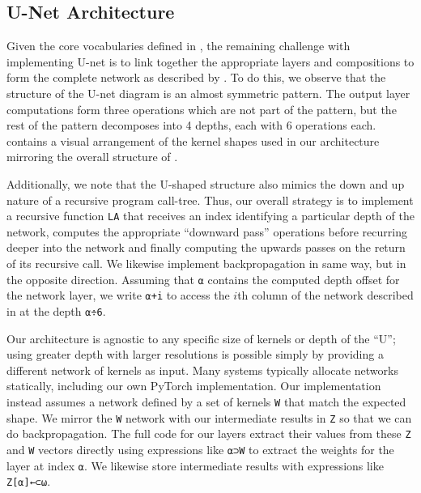 \documentclass[10pt,twocolumn,english,format=sigplan,screen,balance]{acmart}
\begin{document}
\subsection{U-Net Architecture\label{subsec:U-net-Architecture}}

Given the core vocabularies defined in ,
the remaining challenge with implementing U-net is to link together
the appropriate layers and compositions to form the complete network
as described by . To do this, we
observe that the structure of the U-net diagram is an almost symmetric
pattern. The output layer computations form three operations which
are not part of the pattern, but the rest of the pattern decomposes
into 4 depths, each with 6 operations each. 
contains a visual arrangement of the kernel shapes used in our architecture
mirroring the overall structure of . 

Additionally, we note that the U-shaped structure also mimics the
down and up nature of a recursive program call-tree. Thus, our overall
strategy is to implement a recursive function \texttt{LA} that receives
an index identifying a particular depth of the network, computes the
appropriate “downward pass” operations before recurring deeper
into the network and finally computing the upwards passes on the return
of its recursive call. We likewise implement backpropagation in same
way, but in the opposite direction. Assuming that \texttt{⍺} contains
the computed depth offset for the network layer, we write \texttt{⍺+i}
to access the $i$th column of the network described in 
at the depth \texttt{⍺÷6}. 

Our architecture is agnostic to any specific size of kernels or depth
of the “U”; using greater depth with larger resolutions is possible
simply by providing a different network of kernels as input. Many
systems typically allocate networks statically, including our own
PyTorch implementation. Our implementation instead assumes a network
defined by a set of kernels \texttt{W} that match the expected shape.
We mirror the \texttt{W} network with our intermediate results in
\texttt{Z} so that we can do backpropagation. The full code for our
layers extract their values from these \texttt{Z} and \texttt{W} vectors
directly using expressions like \texttt{⍺⊃W} to extract the weights
for the layer at index \texttt{⍺}. We likewise store intermediate
results with expressions like \texttt{Z{[}⍺{]}←⊂⍵}.
\end{document}
